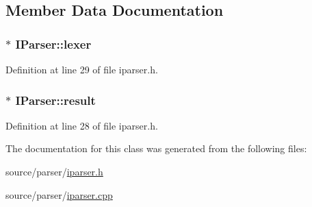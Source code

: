 \subsection{Member Data Documentation}
\hypertarget{class_i_parser_a2c89fe9ae1c200eda69c78f7441dea00}{
\subsubsection[{lexer}]{$\ast$ I\-Parser\-::lexer\hspace{0.3cm}{\ttfamily [protected]}}}\label{class_i_parser_a2c89fe9ae1c200eda69c78f7441dea00}


Definition at line 29 of file iparser.\-h.

\hypertarget{class_i_parser_a525c62c560492ef3bdb1a21c4da13e04}{
\subsubsection[{result}]{$\ast$ I\-Parser\-::result\hspace{0.3cm}{\ttfamily [protected]}}}\label{class_i_parser_a525c62c560492ef3bdb1a21c4da13e04}


Definition at line 28 of file iparser.\-h.



The documentation for this class was generated from the following files\-:\begin{DoxyCompactItemize}
\item 
source/parser/\hyperlink{iparser_8h}{iparser.\-h}\item 
source/parser/\hyperlink{iparser_8cpp}{iparser.\-cpp}\end{DoxyCompactItemize}
